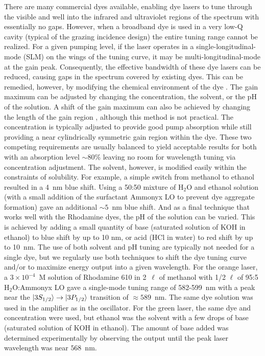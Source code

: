 There are many commercial dyes available, enabling dye lasers to tune through
the visible and well into the infrared and ultraviolet regions of the
spectrum with essentially no gaps.  However, when a broadband dye is used
in a very low-Q cavity (typical of the grazing incidence design) the entire
tuning range cannot be realized.  For a given pumping level, if the laser
operates in a single-longitudinal-mode (SLM) on the wings of the tuning curve,
it may be multi-longitudinal-mode at the gain peak.  Consequently, the effective
bandwidth of these dye lasers can be reduced, causing gaps in the spectrum
covered by existing dyes. This can be remedied, however, by modifying the
chemical environment of the dye \cite{Schafer_book}. The gain maximum can be
adjusted by changing the concentration, the solvent, or the pH of the solution. 
A shift of the gain maximum can also be achieved by changing the length of the
gain region \cite{Schafer_book}, although this method is not practical.  The
concentration is typically adjusted to provide good pump absorption while still
providing a near cylindrically symmetric gain region within the dye.  These two
competing requirements are usually balanced to yield acceptable results for both
with an absorption level $\sim 80$\% leaving no room for wavelength tuning via
concentration adjustment.  The solvent, however, is modified easily within the
constraints of solubility.  For example, a simple switch from methanol to
ethanol resulted in a 4~nm blue shift.  Using a 50:50 mixture of H$_2$O and
ethanol solution (with a small addition of the surfactant Ammonyx LO to
prevent dye aggregate formation) gave an additional $\sim 5$~nm blue shift.
And as a final technique that works well with the Rhodamine dyes, the pH of
the solution can be varied.  This is achieved by adding a small quantity
of base (saturated solution of KOH in ethanol) to blue shift by up to 10 nm,
or acid (HCl in water) to red shift by up to 10~nm.  The use of both solvent
and pH tuning are typically not needed for a single dye, but we regularly use
both techniques to shift the dye tuning curve and/or to maximize energy
output into a given wavelength.  For the orange laser, a $ 3 \times
10^{-4}$~M solution of Rhodamine 610 in 2~$\ell$ of methanol with 1/2 $\ell$
of 95:5 H$_2$O:Ammonyx LO gave a  single-mode tuning range of 582-599~nm
with a peak near the $\vert 3S_{1/2} \rangle \rightarrow \vert 3P_{1/2} \rangle$ transition of
$ \approx 589$~nm.  The same dye solution was used in the amplifier as in the
oscillator.  For the green laser, the same dye and concentration were used,
but ethanol was the solvent with a few drops of base (saturated solution of
KOH in ethanol).  The amount of base added was determined experimentally by
observing the output until the peak laser wavelength was near $568$~nm.

